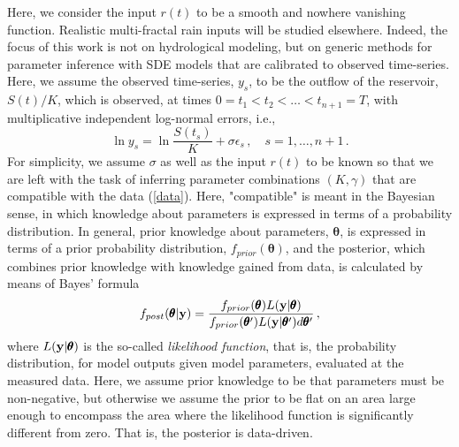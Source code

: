 \documentclass[12pt,a4paper,final]{iopart}
\newcommand{\bt}{\pmb\theta}
\newcommand{\vc}[1]{{\bf #1 }}
\begin{document}
Here, we consider the input $r(t)$ to be a smooth and nowhere vanishing function. Realistic multi-fractal rain inputs will be studied elsewhere.
Indeed, the focus of this work is not on hydrological modeling, but on generic methods for parameter inference with SDE models that are calibrated to observed time-series.
Here, we assume the observed time-series, $y_s$, to be the outflow of the reservoir, $S(t)/K$, which is observed, at times $0=t_1<t_2<\dots < t_{n+1}=T$, with multiplicative independent log-normal errors, i.e.,
\begin{equation}\label{data}
  \ln y_s
  =
  \ln\frac{S(t_s)}{K}
  +
  \sigma\epsilon_s\,,\quad s=1,\dots,n+1\,.
\end{equation}
For simplicity, we assume $\sigma$ as well as the input $r(t)$ to be known so that we are left with the task of inferring parameter combinations $(K,\gamma)$ that are compatible with the data (\ref{data}).
Here, "compatible" is meant in the Bayesian sense, in which knowledge about parameters is expressed in terms of a probability distribution.
In general, prior knowledge about parameters, $\bt$, is expressed in terms of a prior probability distribution, $f_{prior}(\bt)$, and the posterior, which combines prior knowledge with knowledge gained from data, is calculated by means of Bayes' formula
\begin{equation}\label{Bayes}
  f_{post}(\bt|\vc y)
  =
  \frac{f_{prior}(\bt)L(\vc y|\bt)}
  {f_{prior}(\bt')L(\vc y|\bt')d\bt'}\,,
\end{equation}
where $L(\vc y|\bt)$ is the so-called {\em likelihood function}, that is, the probability distribution, for model outputs given model parameters, evaluated at the measured data.
Here, we assume prior knowledge to be that parameters must be non-negative, but otherwise we assume the prior to be flat on an area large enough to encompass the area where the likelihood function is significantly different from zero. That is, the posterior is data-driven.
\end{document}
